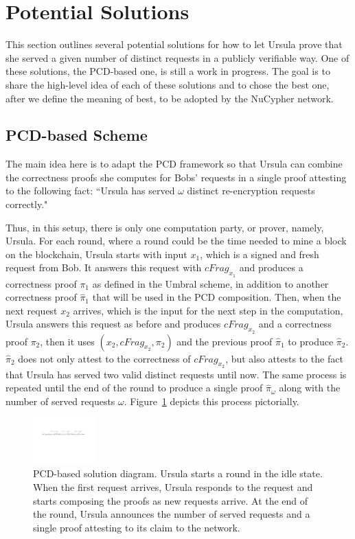 \section{Potential Solutions}
\label{solutions}
This section outlines several potential solutions for how to let Ursula prove 
that she served a given number of distinct requests in a publicly verifiable way. 
One of these solutions, the PCD-based one, is still a work in progress. The goal 
is to share the high-level idea of each of these solutions and to chose the best one,
after we define the meaning of best, to be adopted by the NuCypher network.


\subsection{PCD-based Scheme}
The main idea here is to adapt the PCD framework so that Ursula
can combine the correctness proofs she computes for Bobs' requests in a single proof 
attesting to the following fact: ``Ursula has served $\omega$ distinct re-encryption 
requests correctly." 


Thus, in this setup, there is only one computation party, or prover, namely, Ursula. 
For each round, where a round could be the time needed to mine a block on the 
blockchain, Ursula starts with input $x_1$, which is a signed and fresh request
from Bob. It answers this request with $cFrag_{x_1}$ and produces a correctness 
proof $\pi_1$ as defined in the Umbral scheme, in addition to another correctness 
proof $\hat{\pi}_1$ that will be used in the PCD composition. Then, when the next request $x_2$ arrives, 
which is the input for the next step in the computation, Ursula answers 
this request as before and produces $cFrag_{x_2}$ and a correctness proof $\pi_2$, then 
it uses $(x_2, cFrag_{x_2}, \pi_2)$ and the previous proof $\hat{\pi}_1$ to produce $\hat{\pi}_2$. 
$\hat{\pi}_2$ does not only 
attest to the correctness of $cFrag_{x_2}$, but also attests to the fact that Ursula has served 
two valid distinct requests until now. The same process is repeated until the end of the 
round to produce a single proof $\hat{\pi}_{\omega}$ along with the number of 
served requests $\omega$. Figure~\ref{pcd-based-sol} depicts 
this process pictorially.


\begin{figure}[h!]
\centerline{
\includegraphics[height= 0.7in, width = 1.0\columnwidth]{figures/pcd-based-sol.pdf}}
\caption{PCD-based solution diagram. Ursula starts a round in the idle state. When 
the first request arrives, Ursula responds to the request and starts composing the 
proofs as new requests arrive. At the end of the round, Ursula announces the number of 
served requests and a single proof attesting to its claim to the network. }
\label{pcd-based-sol}
\end{figure}


